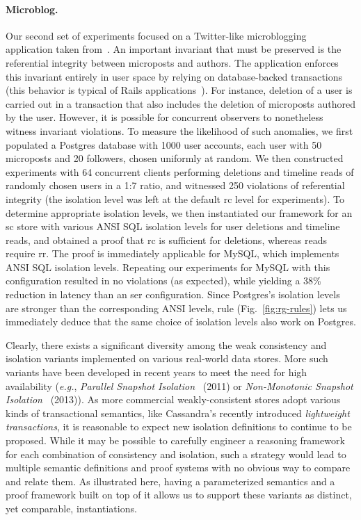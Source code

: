 \paragraph{Microblog.} Our second set of experiments focused on a
Twitter-like microblogging application taken from~\cite{railsbook}.
An important invariant that must be preserved is the referential
integrity between microposts and authors. The application enforces
this invariant entirely in user space by relying on database-backed
transactions (this behavior is typical of Rails
applications~\cite{bailisferal}).  For instance, deletion of a user is
carried out in a transaction that also includes the deletion of
microposts authored by the user.  However, it is possible for
concurrent observers to nonetheless witness invariant violations. To
measure the likelihood of such anomalies, we first populated a
Postgres database with 1000 user accounts, each user with 50
microposts and 20 followers, chosen uniformly at random. We then
constructed experiments with 64 concurrent clients performing
deletions and timeline reads of randomly chosen users in a 1:7 ratio,
and witnessed 250 violations of referential integrity (the isolation
level was left at the default {\sc rc} level for experiments). To
determine appropriate isolation levels, we then instantiated our
framework for an {\sc sc} store with various ANSI SQL isolation levels
for user deletions and timeline reads, and obtained a proof that {\sc
rc} is sufficient for deletions, whereas reads require {\sc rr}. The
proof is immediately applicable for MySQL, which implements ANSI SQL
isolation levels. Repeating our experiments for MySQL with this
configuration resulted in no violations (as expected), while yielding
a 38\% reduction in latency than an {\sc ser} configuration.  Since
Postgres's isolation levels are stronger than the corresponding ANSI
levels,  rule (Fig.~\ref{fig:rg-rules}) lets us
immediately deduce that the same choice of isolation levels also work
on Postgres.

Clearly, there exists a significant diversity among the weak
consistency and isolation variants implemented on various real-world
data stores. More such variants have been developed in recent years to
meet the need for high availability (\emph{e.g.}, \emph{Parallel
  Snapshot Isolation}~\cite{psi} (2011) or \emph{Non-Monotonic
  Snapshot Isolation}~\cite{nmsi} (2013)).  As more commercial
weakly-consistent stores adopt various kinds of transactional
semantics, like Cassandra's recently introduced \emph{lightweight
  transactions}, it is reasonable to expect new isolation
definitions to continue to be proposed.  While it may be possible to
carefully engineer a reasoning framework for each combination of
consistency and isolation, such a strategy would lead to multiple
semantic definitions and proof systems with no obvious way to compare
and relate them. As illustrated here, having a parameterized semantics
and a proof framework built on top of it allows us to support these
variants as distinct, yet comparable, instantiations.

